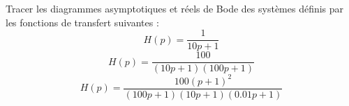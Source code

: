 %    
%    
%    
Tracer les diagrammes asymptotiques et réels de Bode des systèmes définis
par les fonctions de transfert suivantes :
\question{}
\[
H(p) = \dfrac{1}{10p+1}
\]
\question{}
\[
H(p) = \dfrac{100}{(10p+1)(100p+1)}
\]
\question{}
\[
H(p) = \dfrac{100(p+1)^2}{(100p+1)(10p+1)(0.01p+1)}
\]
\question{}
